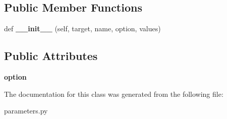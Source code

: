 \subsection*{Public Member Functions}
\begin{DoxyCompactItemize}
\item 
\mbox{\label{classcodar_1_1cheetah_1_1parameters_1_1_param_env_var_a7f0389cec4b151e86fc41fc1548657bd}} 
def {\bfseries \+\_\+\+\_\+init\+\_\+\+\_\+} (self, target, name, option, values)
\end{DoxyCompactItemize}
\subsection*{Public Attributes}
\begin{DoxyCompactItemize}
\item 
\mbox{\label{classcodar_1_1cheetah_1_1parameters_1_1_param_env_var_acb91e037a8f36b24a8588b808ad70444}} 
{\bfseries option}
\end{DoxyCompactItemize}


The documentation for this class was generated from the following file\+:\begin{DoxyCompactItemize}
\item 
parameters.\+py\end{DoxyCompactItemize}

